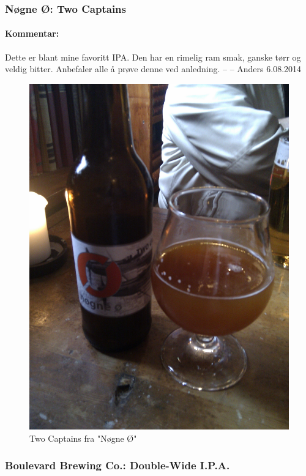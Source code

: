 \documentclass[12pt,a4paper,oneside,norsk]{article}
\begin{document}
\newpage
\subsubsection{Nøgne Ø: Two Captains}
\paragraph{Kommentar:} Dette er blant mine favoritt IPA. Den har en rimelig ram smak, ganske tørr og veldig bitter. Anbefaler alle å prøve denne ved anledning. 
\newline
-- -- Anders 6.08.2014

\begin{figure} [H]
\centering
\includegraphics[scale=0.1, angle=0]{Bilder/Ol/twoCpt.jpg}
\caption{Two Captains fra "Nøgne Ø"}
\end{figure}

\newpage
\subsubsection{Boulevard Brewing Co.: Double-Wide I.P.A.}
\end{document}
